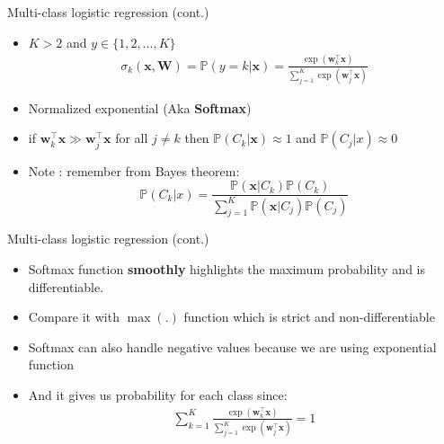 \documentclass[serif, aspectratio=169]{beamer}
\begin{document}
\begin{frame}{Multi-class logistic regression (cont.)}
    \begin{itemize}
        \item $K > 2$ and $y \in \{1,2,\dots,K\}$
        \begin{align*}
            \sigma _k(\mathbf{x}, \mathbf{W}) = \mathbb{P}(y=k|\mathbf{x}) = \frac{\exp{(\mathbf{w}^\top _k\mathbf{x})}}{\sum_{j=1}^{K}\exp{(\mathbf{w}_j^\top\mathbf{x})}}
        \end{align*}
        \item Normalized exponential (Aka \textbf{Softmax})
          
            \item if $\mathbf{w}_k^\top \mathbf{x} \gg \mathbf{w}_j^\top \mathbf{x}$ for all $j \neq k$ then $\mathbb{P}(C_k|\mathbf{x}) \approx 1$ and $\mathbb{P}(C_j|x) \approx 0$
            \item Note : remember from Bayes theorem:
                \[
                \mathbb{P}(C_k|x) = \frac{\mathbb{P}(\mathbf{x}|C_k)\mathbb{P}(C_k)}
            {\sum_{j=1}^{K}\mathbb{P}(\mathbf{x}|C_j)\mathbb{P}(C_j)}
                \]
          
    \end{itemize}
\end{frame}
\begin{frame}{Multi-class logistic regression (cont.)}
    \begin{itemize}
        \item Softmax function \textbf{smoothly} highlights the maximum probability and is differentiable.
        \item Compare it with $\max (.)$ function which is strict and non-differentiable
        \item Softmax can also handle negative values because we are using exponential function
        \item And it gives us probability for each class since:
            \begin{align*}
                \displaystyle \sum _{k=1}^{K} \frac{\exp (\mathbf{w}_k^\top \mathbf{x})}{\sum _{j=1}^{K} \exp (\mathbf{w}_j^\top \mathbf{x}) } = 1
            \end{align*}
    \end{itemize}
\end{frame}
\end{document}
